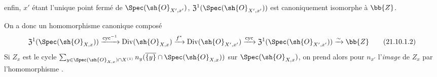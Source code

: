 \begin{env}[21.10.1]
\begin{enumerate}[label=\arabic*\textsuperscript{o}]
enfin, $x'$ étant l'unique point fermé de $\Spec(\sh{O}_{X',x'})$, $\mathfrak{Z}^1(\Spec(\sh{O}_{X',x'}))$ est canoniquement isomorphe à $\bb{Z}$.
\end{enumerate}
On a donc un homomorphisme canonique composé
\[
\label{IV.21.10.1.2}
  \mathfrak{Z}^1(\Spec(\sh{O}_{X,x}))
  \xrightarrow{\operatorname{cyc}^{-1}}\operatorname{Div}(\sh{O}_{X,x})
  \xrightarrow{f^*}\operatorname{Div}(\sh{O}_{X',x'})
  \xrightarrow{\operatorname{cyc}}\mathfrak{Z}^1(\Spec(\sh{O}_{X',x'}))
  \xrightarrow{\sim}\bb{Z}
  \tag{21.10.1.2}
\]
Si $Z_x$ est le cycle $\sum_{y\in\Spec(\sh{O}_{X,x})\cap X^{(1)}}n_y(\overline{\{y\}}\cap\Spec(\sh{O}_{X,x}))$ sur $\Spec(\sh{O}_{X,x})$, on prend alors pour $n_{x'}$ l'\emph{image} de $Z_x$ par l'homomorphisme .
\end{env}

